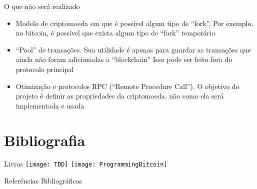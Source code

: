 \documentclass{beamer}
\begin{document}
\begin{frame}{O que não será realizado}
  \begin{itemize}
    \item Modelo de criptomoeda em que é possível algum tipo de \foreignquote{english}{fork}.
      Por exemplo, no bitcoin, é possível que exista algum tipo de \foreignquote{english}{fork} temporário
    \item \foreignquote{english}{Pool} de transações.
      Sua utilidade é apenas para guardar as transações que ainda não foram adicionadas a \foreignquote{english}{blockchain}
      Isso pode ser feito fora do protocolo principal
    \item Otimização e protocolos RPC (\foreignquote{english}{Remote Procedure Call}).
      O objetivo do projeto é definir as propriedades da criptomoeda, não como ela será implementada e usada
  \end{itemize}
\end{frame}

\section{Bibliografia}

 \begin{frame}{Livros}
    \texttt{[image: TDD]}
    \texttt{[image: ProgrammingBitcoin]}
 \end{frame}
  

\begin{frame}{Referências Bibliográficas}
  
  
\end{frame}
\end{document}
